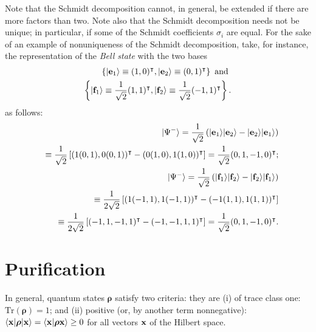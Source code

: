 Note that the Schmidt decomposition cannot, in general, be extended if there are more factors than two.
Note also that the Schmidt decomposition needs not be unique;\cite{ekert:415}
in particular, if some of the Schmidt coefficients $\sigma_i$ are equal.
For the sake of an example of nonuniqueness of the Schmidt decomposition,
take, for instance, the representation of the {\em Bell state} 
with the two bases
\begin{equation}
\begin{split}
\left\{
\vert {\bf e}_1\rangle \equiv (1,0)^\intercal ,
\vert {\bf e}_2\rangle \equiv (0,1)^\intercal
\right\}
\textrm{ and }\\
\left\{
\vert {\bf f}_1\rangle \equiv \frac{1}{\sqrt{2}}(1,1)^\intercal ,
\vert {\bf f}_2\rangle \equiv \frac{1}{\sqrt{2}}(-1,1)^\intercal
\right\}.
\end{split}
\end{equation}
as follows:
\begin{equation}
\begin{split}
\vert {\Psi^-} \rangle =
\frac{1}{\sqrt{2}}
\left(
\vert {\bf e}_1\rangle
\vert {\bf e}_2\rangle
-
\vert {\bf e}_2\rangle
\vert {\bf e}_1\rangle
\right)\\
\quad \equiv
\frac{1}{\sqrt{2}}
\left[
(1 (0,1),0(0,1))^\intercal - (0 (1,0),1(1,0))^\intercal \right] = \frac{1}{\sqrt{2}} (0,1,-1,0)^\intercal ; \\
\vert {\Psi^-} \rangle =
\frac{1}{\sqrt{2}}
\left(
\vert {\bf f}_1\rangle
\vert {\bf f}_2\rangle
-
\vert {\bf f}_2\rangle
\vert {\bf f}_1\rangle
\right) \\
\quad \equiv
\frac{1}{2\sqrt{2}}
\left[
(1 (-1,1),1(-1,1))^\intercal - ( -1 (1,1),1(1,1))^\intercal \right]  \\
\quad \equiv
\frac{1}{2\sqrt{2}}
\left[
( -1  , 1 ,-1 ,1 )^\intercal  - ( -1,-1 ,1 ,1 )^\intercal \right]
 = \frac{1}{\sqrt{2}} (0,1,-1,0)^\intercal
.
\end{split}
\end{equation}



\section{Purification}
\label{2015-m-ch-fdvs-purification}


In general, quantum states ${\boldsymbol{\rho}}$ satisfy two criteria:\cite{ba-89}  they are
(i) of trace class one:
$\textrm{Tr}({\boldsymbol{\rho}}) =1$;
and
(ii) positive (or, by another term nonnegative):
$
\langle {\bf x} \vert {\boldsymbol{\rho}} \vert {\bf x} \rangle
=\langle {\bf x} \vert {\boldsymbol{\rho}}  {\bf x} \rangle \ge  0
$ for all vectors ${\bf x}$ of the  Hilbert space.

